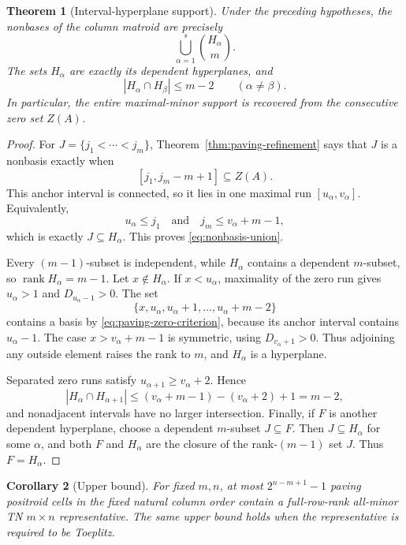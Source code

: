 \documentclass{amsart}
\numberwithin{equation}{section}
\newtheorem{theorem}{Theorem}
\newtheorem{corollary}[theorem]{Corollary}
\theoremstyle{definition}
\theoremstyle{remark}
\DeclareMathOperator{\rank}{rank}
\begin{document}
\begin{theorem}[Interval-hyperplane support]\label{thm:interval-support}
Under the preceding hypotheses, the nonbases of the column matroid are precisely
\begin{equation}\label{eq:nonbasis-union}
 \bigcup_{\alpha=1}^s\binom{H_\alpha}{m}.
\end{equation}
The sets $H_\alpha$ are exactly its dependent hyperplanes, and
\begin{equation}\label{eq:hyperplane-intersection}
 |H_\alpha\cap H_\beta|\le m-2
 \qquad(\alpha\ne\beta).
\end{equation}
In particular, the entire maximal-minor support is recovered from the consecutive zero set $Z(A)$.
\end{theorem}

\begin{proof}
For $J=\{j_1<\cdots<j_m\}$, Theorem~\ref{thm:paving-refinement} says that $J$ is a nonbasis exactly when
\[
 [j_1,j_m-m+1]\subseteq Z(A).
\]
This anchor interval is connected, so it lies in one maximal run $[u_\alpha,v_\alpha]$.  Equivalently,
\[
 u_\alpha\le j_1
 \quad\text{and}\quad
 j_m\le v_\alpha+m-1,
\]
which is exactly $J\subseteq H_\alpha$.  This proves \eqref{eq:nonbasis-union}.

Every $(m-1)$-subset is independent, while $H_\alpha$ contains a dependent $m$-subset, so $\rank H_\alpha=m-1$.  Let $x\notin H_\alpha$.  If $x<u_\alpha$, maximality of the zero run gives $u_\alpha>1$ and $D_{u_\alpha-1}>0$.  The set
\[
 \{x,u_\alpha,u_\alpha+1,\ldots,u_\alpha+m-2\}
\]
contains a basis by \eqref{eq:paving-zero-criterion}, because its anchor interval contains $u_\alpha-1$.  The case $x>v_\alpha+m-1$ is symmetric, using $D_{v_\alpha+1}>0$.  Thus adjoining any outside element raises the rank to $m$, and $H_\alpha$ is a hyperplane.

Separated zero runs satisfy $u_{\alpha+1}\ge v_\alpha+2$.  Hence
\[
 |H_\alpha\cap H_{\alpha+1}|
 \le(v_\alpha+m-1)-(v_\alpha+2)+1=m-2,
\]
and nonadjacent intervals have no larger intersection.  Finally, if $F$ is another dependent hyperplane, choose a dependent $m$-subset $J\subseteq F$.  Then $J\subseteq H_\alpha$ for some $\alpha$, and both $F$ and $H_\alpha$ are the closure of the rank-$(m-1)$ set $J$.  Thus $F=H_\alpha$.
\end{proof}

\begin{corollary}[Upper bound]\label{cor:upper-bound}
For fixed $m,n$, at most $2^{n-m+1}-1$ paving positroid cells in the fixed natural column order contain a full-row-rank all-minor TN $m\times n$ representative.  The same upper bound holds when the representative is required to be Toeplitz.
\end{corollary}
\end{document}
